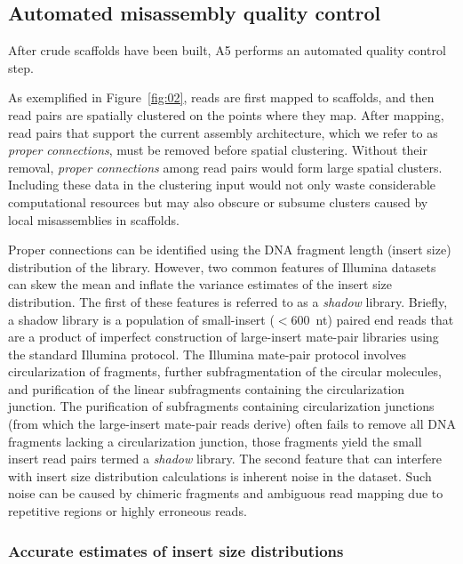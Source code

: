 \documentclass[10pt]{article}
\begin{document}
\subsection*{Automated misassembly quality control}\label{sec:qc}

After crude scaffolds have been built, A5 performs an automated quality control step.

As exemplified in Figure~\ref{fig:02}, reads are first mapped to scaffolds, and then read pairs are spatially clustered on the
points where they map. After mapping, read pairs that support the current assembly architecture, which we 
refer to as \emph{proper connections}, must be removed before spatial clustering. Without their removal, \emph{proper connections}
among read pairs would form large spatial clusters. Including these data in the clustering input would not only waste considerable 
computational resources but may also obscure or subsume clusters caused by local misassemblies in scaffolds. 


Proper connections can be identified using the DNA fragment length (insert size) distribution of the library. However, two common features of
Illumina datasets can skew the mean and inflate the variance estimates of the insert size distribution. The first of these features is referred 
to as a \emph{shadow} library. Briefly, a shadow library is a population of small-insert ($<$600~nt) paired end reads that are a product of 
imperfect construction of large-insert mate-pair libraries using the standard Illumina protocol. The Illumina mate-pair protocol involves 
circularization of fragments, further subfragmentation of the circular molecules, and purification of the linear subfragments containing the circularization junction. 
The purification of subfragments containing circularization junctions (from which the large-insert mate-pair reads derive) often fails to remove all 
DNA fragments lacking a circularization junction, those fragments yield the small insert read pairs termed a \emph{shadow} library. The second 
feature that can interfere with insert size distribution calculations is inherent noise in the dataset. Such noise can be caused by chimeric 
fragments and ambiguous read mapping due to repetitive regions or highly erroneous reads. 


\subsubsection*{Accurate estimates of insert size distributions}
\end{document}
